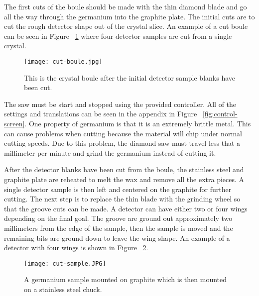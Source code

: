 The first cuts of the boule should be made with the thin diamond blade and go all the way through the germanium into the graphite plate.
The initial cuts are to cut the rough detector shape out of the crystal slice.
An example of a cut boule can be seen in Figure ~\ref{fig:cutboule} where four detector samples are cut from a single crystal.
\begin{figure}[htpb]
\centering
\texttt{[image: cut-boule.jpg]}
\caption{This is the crystal boule after the initial detector sample blanks have been cut.}
\label{fig:cutboule}
\end{figure}
The saw must be start and stopped using the provided controller.
All of the settings and translations can be seen in the appendix in Figure ~\ref{fig:control-screen}.
One property of germanium is that it is an extremely brittle metal.
This can cause problems when cutting because the material will chip under normal cutting speeds.
Due to this problem, the diamond saw must travel less that a millimeter per minute and grind the germanium instead of cutting it.

After the detector blanks have been cut from the boule, the stainless steel and graphite plate are reheated to melt the wax and remove all the extra pieces.
A single detector sample is then left and centered on the graphite for further cutting.
The next step is to replace the thin blade with the grinding wheel so that the groove cuts can be made.
A detector can have either two or four wings depending on the final goal.
The groove are ground out approximately two millimeters from the edge of the sample, then the sample is moved and the remaining bits are ground down to leave the wing shape.
An example of a detector with four wings is shown in Figure ~\ref{fig:cut-sample}.
\begin{figure}[htpb]
\centering
\texttt{[image: cut-sample.JPG]}
\caption{A germanium sample mounted on graphite which is then mounted on a stainless steel chuck.}
\label{fig:cut-sample}
\end{figure}

